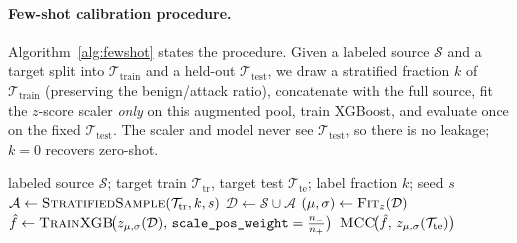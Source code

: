 \documentclass[preprint,12pt,authoryear]{elsarticle}
\begin{document}
\paragraph{Few-shot calibration procedure.} Algorithm~\ref{alg:fewshot} states the
procedure. Given a labeled source $\mathcal{S}$ and a target split into
$\mathcal{T}_{\text{train}}$ and a held-out $\mathcal{T}_{\text{test}}$, we draw a
stratified fraction $k$ of $\mathcal{T}_{\text{train}}$ (preserving the
benign/attack ratio), concatenate with the full source, fit the $z$-score scaler
\emph{only} on this augmented pool, train XGBoost, and evaluate once on the fixed
$\mathcal{T}_{\text{test}}$. The scaler and model never see
$\mathcal{T}_{\text{test}}$, so there is no leakage; $k=0$ recovers zero-shot.

\begin{algorithm}[htbp]
\caption{Few-shot cross-network calibration}
\label{alg:fewshot}
\begin{algorithmic}[1]
\Require labeled source $\mathcal{S}$; target train $\mathcal{T}_{\text{tr}}$,
target test $\mathcal{T}_{\text{te}}$; label fraction $k$; seed $s$
\State $\mathcal{A} \gets \textsc{StratifiedSample}(\mathcal{T}_{\text{tr}}, k, s)$
\State $\mathcal{D} \gets \mathcal{S} \cup \mathcal{A}$
\State $(\mu,\sigma) \gets \textsc{Fit}_{z}(\mathcal{D})$
\State $\hat{f} \gets \textsc{TrainXGB}\!\big(z_{\mu,\sigma}(\mathcal{D}),\,
\texttt{scale\_pos\_weight}=\tfrac{n_-}{n_+}\big)$
\State \Return $\textsc{MCC}\!\big(\hat{f},\, z_{\mu,\sigma}(\mathcal{T}_{\text{te}})\big)$
\end{algorithmic}
\end{algorithm}
\end{document}
